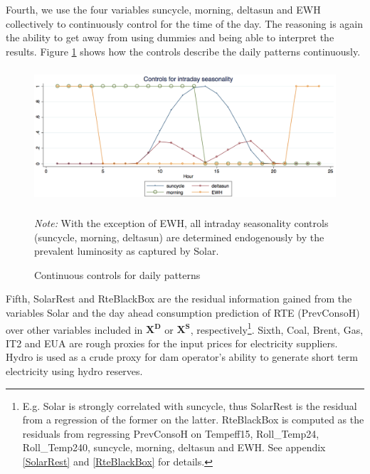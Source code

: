 Fourth, we use the four variables suncycle, morning, deltasun and EWH collectively to continuously control for the time of the day. The reasoning is again the ability to get away from using dummies and being able to interpret the results. Figure \ref{seasonalityday3} shows how the controls describe the daily patterns continuously. 
\begin{figure}[!ht]
\begin{center}
\includegraphics[height=50mm]{figch2/seasonalityday3.pdf} 
\caption{Continuous controls for daily patterns}
\label{seasonalityday3}
\end{center}
\emph{Note:} With the exception of EWH, all intraday seasonality controls (suncycle, morning, deltasun) are determined endogenously by the prevalent luminosity as captured by Solar.
\end{figure}
Fifth, SolarRest and RteBlackBox are the residual information gained from the variables Solar and the day ahead consumption prediction of RTE (PrevConsoH) over other variables included in $\boldsymbol{X^D}$ or $\boldsymbol{X^S}$, respectively\footnote{E.g. Solar is strongly correlated with suncycle, thus SolarRest is the residual from a regression of the former on the latter. RteBlackBox is computed as the residuals from regressing PrevConsoH on Tempeff15,  Roll\_Temp24,  Roll\_Temp240, suncycle, morning, deltasun and EWH. See appendix \ref{SolarRest} and \ref{RteBlackBox} for details.}.  
Sixth, Coal, Brent, Gas, IT2 and EUA are rough proxies for the input prices for electricity suppliers. Hydro is used as a crude proxy for dam operator's ability to generate short term electricity using hydro reserves. 

